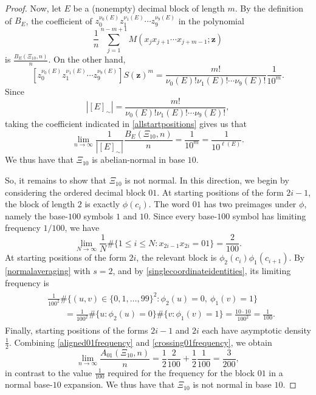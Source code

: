 \documentclass[12pt]{article}
\begin{document}
\begin{proof}
 Now, let $E$ be a (nonempty) decimal block of length $m$.   By the definition of $B_E$, the coefficient of     $z_0^{\nu_0(E)}  
  z_1^{\nu_1(E)}\cdots z_9^{\nu_9(E)}$ in the polynomial   $$  \frac{1}{n}
 \sum_{j=1}^{n-m+1}M(x_jx_{j+1}\cdots x_{j+m-1};\mathbf z)
$$ is $\frac{B_E(\Xi_{10},n)}{n}$. On the other hand,
\begin{equation}\label{takecoefficient}
 \left[z_0^{\nu_0(E)}z_1^{\nu_1(E)}\cdots z_9^{\nu_9(E)}\right]
 S(\mathbf z)^m
 =\frac{m!}{\nu_0(E)!\nu_1(E)!\cdots\nu_9(E)!}\frac{1}{10^m}.
\end{equation}
Since
\begin{equation}\label{equivalenceclasssize}
 \left|[E]_{\sim}\right|
 =\frac{m!}{\nu_0(E)!\nu_1(E)!\cdots\nu_9(E)!},
\end{equation}
taking the  coefficient indicated   in \eqref{allstartpositions} gives us that  
$$
 \lim_{n\to\infty}
 \frac{1}{\left|[E]_{\sim}\right|}
 \frac{B_E(\Xi_{10},n)}{n}
 =\frac{1}{10^m}
 =\frac{1}{10^{\ell(E)}}.
$$
   We thus have that   $\Xi_{10}$ is abelian-normal in base $10$.  

 So, it remains to show that $\Xi_{10}$ is not normal. In this direction, we begin by considering the ordered decimal block $01$. At starting 
 positions of the form $2i-1$, the block of length $2$ is exactly $\phi(c_i)$. The word $01$ has two
preimages under $\phi$, namely the base-$100$ symbols $1$ and $10$.
Since every base-$100$ symbol has limiting frequency $1/100$, we have
\begin{equation}\label{aligned01frequency}
 \lim_{N\to\infty}\frac{1}{N}
 \#\{1\leq i\leq N:x_{2i-1}x_{2i}=01\}
 =\frac{2}{100}.
\end{equation}
 At starting positions of the form $2i$, the relevant block is $\phi_2(c_i)\phi_1(c_{i+1})$. By \eqref{normalaveraging} with $s=2$, and by 
 \eqref{singlecoordinateidentities}, its limiting frequency is
\begin{align}
\begin{split}
 &\frac{1}{100^2}
 \#\{(u,v)\in\{0,1,\ldots,99\}^2:
 \phi_2(u)=0,\ \phi_1(v)=1\} \\
 &\qquad=
 \frac{1}{100^2}
 \#\{u:\phi_2(u)=0\}
 \#\{v:\phi_1(v)=1\}
 =\frac{10\cdot10}{100^2}
 =\frac{1}{100}.
\end{split}\label{crossing01frequency}
\end{align}
  Finally, starting positions of the forms $2i-1$ and $2i$ each have  asymptotic density $\frac{1}{2}$.  Combining
 \eqref{aligned01frequency} and \eqref{crossing01frequency}, we obtain
$$
 \lim_{n\to\infty}\frac{A_{01}(\Xi_{10},n)}{n}
 =\frac{1}{2}\frac{2}{100}
 +\frac{1}{2}\frac{1}{100}
 =\frac{3}{200}, 
$$
 in contrast to the value $\frac{1}{100}$   required for the frequency for the
block $01$ in a normal base-$10$ expansion. We thus have that $\Xi_{10}$ is not
normal in base $10$.
\end{proof}
\end{document}

